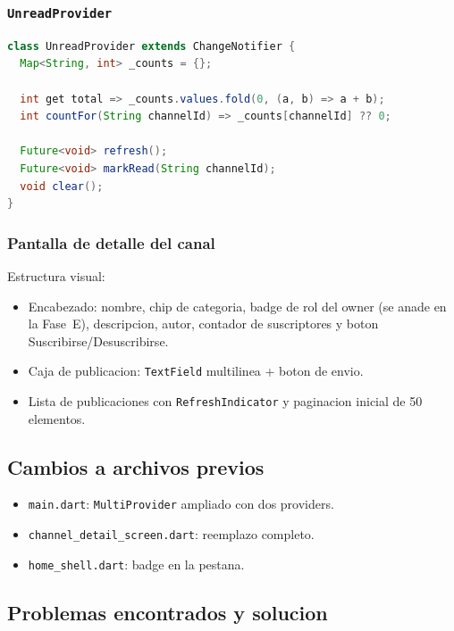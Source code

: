 \subsubsection{\texttt{UnreadProvider}}

\begin{lstlisting}[language=Java]
class UnreadProvider extends ChangeNotifier {
  Map<String, int> _counts = {};

  int get total => _counts.values.fold(0, (a, b) => a + b);
  int countFor(String channelId) => _counts[channelId] ?? 0;

  Future<void> refresh();
  Future<void> markRead(String channelId);
  void clear();
}
\end{lstlisting}

\subsubsection{Pantalla de detalle del canal}

Estructura visual:

\begin{itemize}[leftmargin=*]
  \item Encabezado: nombre, chip de categoria, badge de rol del owner (se anade en la Fase~E), descripcion, autor, contador de suscriptores y boton Suscribirse/Desuscribirse.
  \item Caja de publicacion: \texttt{TextField} multilinea + boton de envio.
  \item Lista de publicaciones con \texttt{RefreshIndicator} y paginacion inicial de 50 elementos.
\end{itemize}

\subsection{Cambios a archivos previos}

\begin{itemize}[leftmargin=*]
  \item \texttt{main.dart}: \texttt{MultiProvider} ampliado con dos providers.
  \item \texttt{channel\_detail\_screen.dart}: reemplazo completo.
  \item \texttt{home\_shell.dart}: badge en la pestana.
\end{itemize}

\subsection{Problemas encontrados y solucion}

